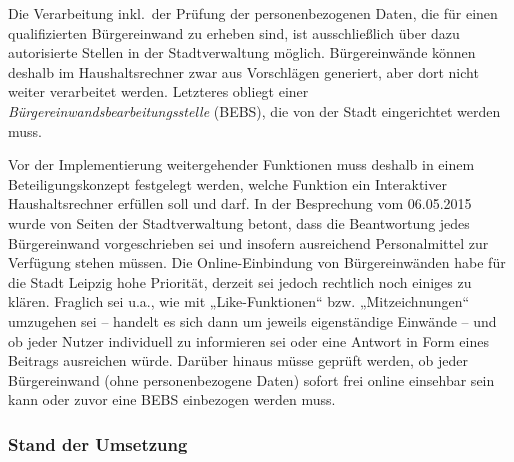 \documentclass[11pt,a4paper,twoside]{article}
\begin{document}
Die Verarbeitung inkl.\ der Prüfung der personenbezogenen Daten, die für einen
qualifizierten Bürgereinwand zu erheben sind, ist ausschließlich über dazu
autorisierte Stellen in der Stadtverwaltung möglich. Bürgereinwände können
deshalb im Haushaltsrechner zwar aus Vorschlägen generiert, aber dort nicht
weiter verarbeitet werden. Letzteres obliegt einer
\emph{Bürgereinwandsbearbeitungsstelle} (BEBS), die von der Stadt eingerichtet
werden muss.

Vor der Implementierung weitergehender Funktionen muss deshalb in einem
Beteiligungskonzept festgelegt werden, welche Funktion ein Interaktiver
Haushaltsrechner erfüllen soll und darf. In der Besprechung vom 06.05.2015
wurde von Seiten der Stadtverwaltung betont, dass die Beantwortung jedes
Bürgereinwand vorgeschrieben sei und insofern ausreichend Personalmittel zur
Verfügung stehen müssen. Die Online-Einbindung von Bürgereinwänden habe für
die Stadt Leipzig hohe Priorität, derzeit sei jedoch rechtlich noch einiges zu
klären. Fraglich sei u.a., wie mit „Like-Funktionen“ bzw. „Mitzeichnungen“
umzugehen sei -- handelt es sich dann um jeweils eigenständige Einwände -- und
ob jeder Nutzer individuell zu informieren sei oder eine Antwort in Form eines
Beitrags ausreichen würde. Darüber hinaus müsse geprüft werden, ob jeder
Bürgereinwand (ohne personenbezogene Daten) sofort frei online einsehbar sein
kann oder zuvor eine BEBS einbezogen werden muss.

\subsubsection*{Stand der Umsetzung} 
\end{document}
